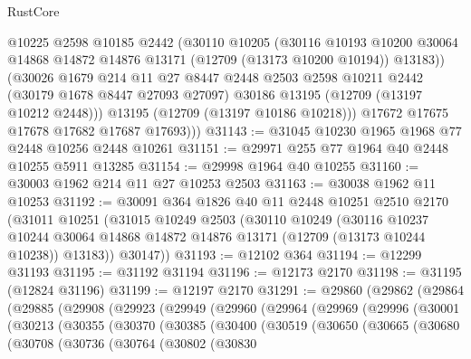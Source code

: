\begin{lexlean}{RustCore}
\begin{coremodule}
            @10225
            @2598
            @10185
            @2442
            (@30110
              @10205
              (@30116
                @10193
                @10200
                @30064
                @14868
                @14872
                @14876
                @13171
                (@12709 (@13173 @10200 @10194))
                @13183))
            (@30026
              @1679
              @214
              @11
              @27
              @8447
              @2448
              @2503
              @2598
              @10211
              @2442
              (@30179 @1678 @8447 @27093 @27097)
              @30186
              @13195
              (@12709 (@13197 @10212 @2448)))
            @13195
            (@12709 (@13197 @10186 @10218)))
          @17672
          @17675
          @17678
          @17682
          @17687
          @17693)))
@31143 := @31045 @10230 @1965 @1968 @77 @2448 @10256 @2448 @10261
@31151 := @29971 @255 @77 @1964 @40 @2448 @10255 @5911 @13285
@31154 := @29998 @1964 @40 @10255
@31160 := @30003 @1962 @214 @11 @27 @10253 @2503
@31163 := @30038 @1962 @11 @10253
@31192 := @30091
    @364
    @1826
    @40
    @11
    @2448
    @10251
    @2510
    @2170
    (@31011
      @10251
      (@31015
        @10249
        @2503
        (@30110
          @10249
          (@30116
            @10237
            @10244
            @30064
            @14868
            @14872
            @14876
            @13171
            (@12709 (@13173 @10244 @10238))
            @13183))
        @30147))
@31193 := @12102 @364
@31194 := @12299 @31193
@31195 := @31192 @31194
@31196 := @12173 @2170
@31198 := @31195 (@12824 @31196)
@31199 := @12197 @2170
@31291 := @29860
    (@29862
      (@29864
        (@29885
          (@29908
            (@29923
              (@29949
                (@29960
                  (@29964
                    (@29969
                      (@29996
                        (@30001
                          (@30213
                            (@30355
                              (@30370
                                (@30385
                                  (@30400
                                    (@30519
                                      (@30650
                                        (@30665
                                          (@30680
                                            (@30708
                                              (@30736
                                                (@30764
                                                  (@30802
                                                    (@30830

\end{coremodule}
\end{lexlean}
